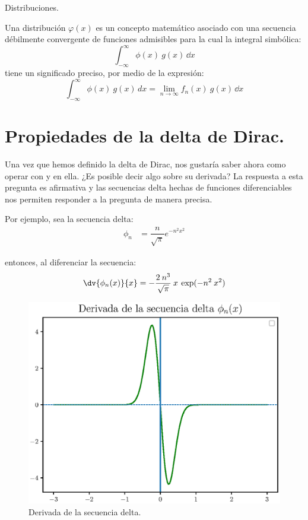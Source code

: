 \begin{defi}
Distribuciones.

Una distribución $\varphi (x)$ es un concepto matemático asociado con una secuencia débilmente convergente de funciones admisibles para la cual la integral simbólica:
\begin{equation}
\int_{-\infty}^{\infty} \phi (x) \:  g(x) \, \dd{x}
\label{eq:ecuacion_1_101}
\end{equation}
tiene un significado preciso, por medio de la expresión:
\begin{equation}
\int_{-\infty}^{\infty} \phi (x) \: g(x) \, dx = \lim_{n \to \infty} f_{n}(x) \: g(x) \, \dd{x}
\label{eq:ecuacion_1_102}
\end{equation}
\end{defi}

\section{Propiedades de la delta de Dirac.}

Una vez que hemos definido la delta de Dirac, nos gustaría saber ahora como operar con y en ella. ¿Es posible decir algo sobre su derivada? La respuesta a esta pregunta es afirmativa y las secuencias delta hechas de funciones diferenciables nos permiten responder a la pregunta de manera precisa.
\par
Por ejemplo, sea la secuencia delta:
\begin{align*}
\phi_{n} &= \dfrac{n}{\sqrt{\pi}} e^{-n^{2} x^{2}}
\end{align*}

entonces, al diferenciar la secuencia:
\begin{align*}
\dv{\phi_{n}(x)}{x} = - \dfrac{2 \: n^{3}}{\sqrt{\pi}} \: x \: \exp(-n^{2} \: x^{2})
\end{align*}

\begin{figure}[H]
    \centering
    \includegraphics[scale=0.8]{Imagenes/secuencia_delta_04.eps}
    \caption{Derivada de la secuencia delta.}
    \label{fig:fig_figura_delta_04}
\end{figure}

